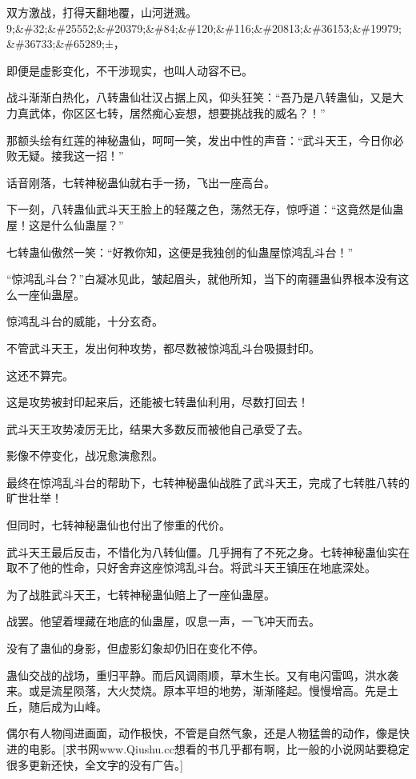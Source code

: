 
\begin{this_body}

双方激战，打得天翻地覆，山河迸溅。9;\&\#32;\&\#25552;\&\#20379;\&\#84;\&\#120;\&\#116;\&\#20813;\&\#36153;\&\#19979;\&\#36733;\&\#65289;±，

即便是虚影变化，不干涉现实，也叫人动容不已。

战斗渐渐白热化，八转蛊仙壮汉占据上风，仰头狂笑：“吾乃是八转蛊仙，又是大力真武体，你区区七转，居然痴心妄想，想要挑战我的威名？！”

那额头绘有红莲的神秘蛊仙，呵呵一笑，发出中性的声音：“武斗天王，今日你必败无疑。接我这一招！”

话音刚落，七转神秘蛊仙就右手一扬，飞出一座高台。

下一刻，八转蛊仙武斗天王脸上的轻蔑之色，荡然无存，惊呼道：“这竟然是仙蛊屋！这是什么仙蛊屋？”

七转蛊仙傲然一笑：“好教你知，这便是我独创的仙蛊屋惊鸿乱斗台！”

“惊鸿乱斗台？”白凝冰见此，皱起眉头，就他所知，当下的南疆蛊仙界根本没有这么一座仙蛊屋。

惊鸿乱斗台的威能，十分玄奇。

不管武斗天王，发出何种攻势，都尽数被惊鸿乱斗台吸摄封印。

这还不算完。

这是攻势被封印起来后，还能被七转蛊仙利用，尽数打回去！

武斗天王攻势凌厉无比，结果大多数反而被他自己承受了去。

影像不停变化，战况愈演愈烈。

最终在惊鸿乱斗台的帮助下，七转神秘蛊仙战胜了武斗天王，完成了七转胜八转的旷世壮举！

但同时，七转神秘蛊仙也付出了惨重的代价。

武斗天王最后反击，不惜化为八转仙僵。几乎拥有了不死之身。七转神秘蛊仙实在取不了他的性命，只好舍弃这座惊鸿乱斗台。将武斗天王镇压在地底深处。

为了战胜武斗天王，七转神秘蛊仙赔上了一座仙蛊屋。

战罢。他望着埋藏在地底的仙蛊屋，叹息一声，一飞冲天而去。

没有了蛊仙的身影，但虚影幻象却仍旧在变化不停。

蛊仙交战的战场，重归平静。而后风调雨顺，草木生长。又有电闪雷鸣，洪水袭来。或是流星陨落，大火焚烧。原本平坦的地势，渐渐隆起。慢慢增高。先是土丘，随后成为山峰。

偶尔有人物闯进画面，动作极快，不管是自然气象，还是人物猛兽的动作，像是快进的电影。[求书网www.Qiushu.cc想看的书几乎都有啊，比一般的小说网站要稳定很多更新还快，全文字的没有广告。]


\end{this_body}
